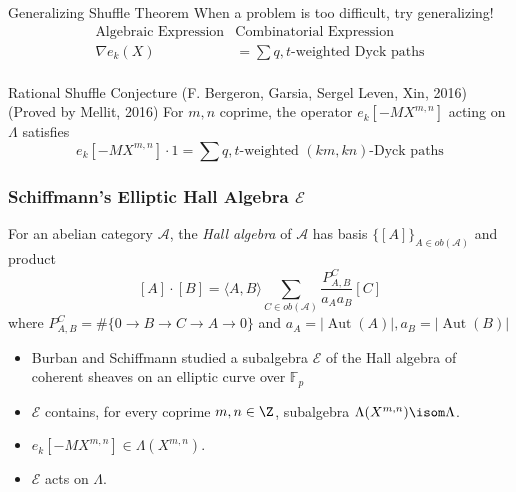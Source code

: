 \documentclass{beamer}
\newcommand{\sym}{\Lambda}
\newcommand{\Ecal}{{\mathcal E}}
\newcommand{\Acal}{{\mathcal A}}
\DeclareMathOperator{\Aut}{Aut}
\newcommand{\F}{\mathbb{F}}
\newcounter{c}
\begin{document}
\begin{frame}{Generalizing Shuffle Theorem}
  When a problem is too difficult, try generalizing! \pause
  \begin{eqnarray*}
    \text{Algebraic Expression} & \text{Combinatorial Expression}\\
    \nabla e_k(X) & = \sum q,t\text{-weighted Dyck paths}\\
  \end{eqnarray*}\pause
  \vspace{-5ex}
   \begin{block}{Rational Shuffle Conjecture (F. Bergeron, Garsia,
      Sergel Leven, Xin, 2016) (Proved by Mellit, 2016)}
    For \(m,n\) coprime, the operator \(e_k[-MX^{m,n}]\) acting on
    \(\sym\) satisfies \[
      e_k[-M X^{m,n}] \cdot 1 = \sum q,t\text{-weighted
      }(km,kn)\text{-Dyck paths}
    \]
    \end{block}\pause
\end{frame}
\begin{frame}
  \frametitle{Schiffmann's Elliptic Hall Algebra \(\Ecal\)}
  For an abelian category \(\Acal\), the \emph{Hall algebra} of
  \(\Acal\) has basis \(\{[A]\}_{A \in ob(\Acal)}\) and product
  \pause \[
    [A] \cdot [B] = \langle A,B \rangle \sum_{C \in ob(\Acal)}
    \frac{P_{A,B}^C}{a_A a_B} [C]
  \]
  where \(P_{A,B}^C = \# \{0 \to B \to C \to A \to 0\}\) and \(a_A =
  |\Aut(A)|, a_B = |\Aut(B)|\)\pause
  \begin{itemize}
  \item Burban and Schiffmann studied a subalgebra \(\Ecal\) of the
    Hall algebra of coherent sheaves on an elliptic curve over \(\F_p\)\pause
  \item \(\Ecal\) contains, for every coprime \(m,n \in \Z\),
    subalgebra \(\sym(X^{m,n}) \isom \sym\). \pause
  \item \(e_k[-MX^{m,n}] \in \sym(X^{m,n})\).\pause
  \item \(\Ecal\) acts on \(\sym\).
  \end{itemize}
\end{frame}
\end{document}
